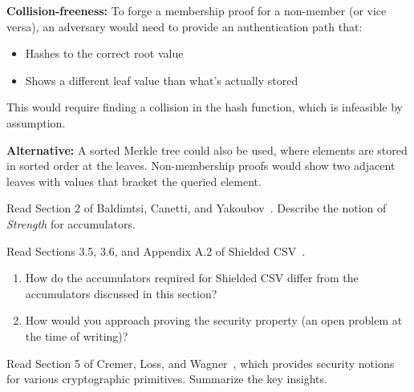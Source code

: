 \begin{mysolution}
  \textbf{Collision-freeness:} To forge a membership proof for a non-member (or vice versa), an adversary would need to provide an authentication path that:
  \begin{itemize}
    \item Hashes to the correct root value
    \item Shows a different leaf value than what's actually stored
  \end{itemize}
  This would require finding a collision in the hash function, which is infeasible by assumption.
  
  \textbf{Alternative:} A sorted Merkle tree could also be used, where elements are stored in sorted order at the leaves.
  Non-membership proofs would show two adjacent leaves with values that bracket the queried element.
\end{mysolution}
\fi

\begin{exercise}[Optional]
  Read Section 2 of Baldimtsi, Canetti, and Yakoubov~\cite{RSA:BalCanYak20}.
  Describe the notion of \emph{Strength} for accumulators.
\end{exercise}

\begin{exercise}[Optional]
  Read Sections 3.5, 3.6, and Appendix A.2 of Shielded CSV~\cite{nick2025shielded}.
  \begin{enumerate}
    \item How do the accumulators required for Shielded CSV differ from the accumulators discussed in this section?
    \item How would you approach proving the  security property (an open problem at the time of writing)?
  \end{enumerate}
\end{exercise}

\begin{exercise}[Optional]
  Read Section 5 of Cremer, Loss, and Wagner~\cite{EC:CreLosWag24}, which provides security notions for various cryptographic primitives.
  Summarize the key insights.
\end{exercise}


